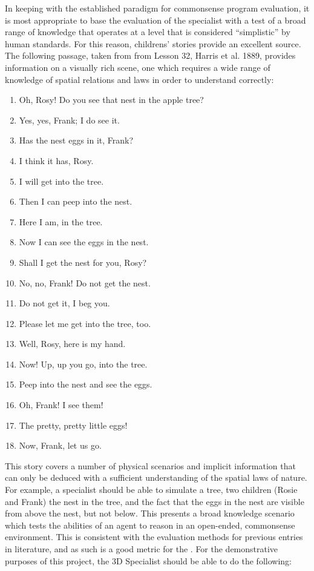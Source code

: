 In keeping with the established paradigm for commonsense program evaluation, it is most appropriate to base the evaluation of the specialist with a test of a broad range of knowledge that operates at a level that is considered ``simplistic'' by human standards. For this reason, childrens' stories provide an excellent source. The following passage, taken from from Lesson 32, Harris et al. 1889, provides information on a visually rich scene, one which requires a wide range of knowledge of spatial relations and laws in order to understand correctly:

\begin{center}
	\begin{enumerate}[topsep=0pt,itemsep=-1em]
		\item Oh, Rosy! Do you see that nest in the apple tree?
		\item Yes, yes, Frank; I do see it.
		\item Has the nest eggs in it, Frank?
		\item I think it has, Rosy.
		\item I will get into the tree.
		\item Then I can peep into the nest.
		\item Here I am, in the tree.
		\item Now I can see the eggs in the nest.
		\item Shall I get the nest for you, Rosy?
		\item No, no, Frank! Do not get the nest.
		\item Do not get it, I beg you.
		\item Please let me get into the tree, too.
		\item Well, Rosy, here is my hand.
		\item Now! Up, up you go, into the tree.
		\item Peep into the nest and see the eggs.
		\item Oh, Frank! I see them!
		\item The pretty, pretty little eggs!
		\item Now, Frank, let us go.
	\end{enumerate}
\end{center}

This story covers a number of physical scenarios and implicit information that can only be deduced with a sufficient understanding of the spatial laws of nature. For example, a specialist should be able to simulate a tree, two children (Rosie and Frank) the nest in the tree, and the fact that the eggs in the nest are visible from above the nest, but not below. This presents a broad knowledge scenario which tests the abilities of an agent to reason in an open-ended, commonsense environment. This is consistent with the evaluation methods for previous entries in literature, and as such is a good metric for the \TDS \cite{egg-cracking,johnston2008comirit,schubert2000episodic}. For the demonstrative purposes of this project, the 3D Specialist should be able to do the following:

